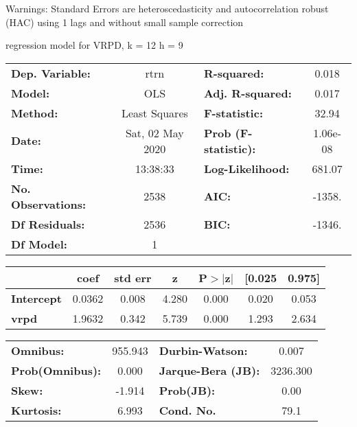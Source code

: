 Warnings: \newline
 [1] Standard Errors are heteroscedasticity and autocorrelation robust (HAC) using 1 lags and without small sample correction\ 

regression model for VRPD, k = 12 h = 9\begin{center}
\begin{tabular}{lclc}
\toprule
\textbf{Dep. Variable:}    &       rtrn       & \textbf{  R-squared:         } &     0.018   \\
\textbf{Model:}            &       OLS        & \textbf{  Adj. R-squared:    } &     0.017   \\
\textbf{Method:}           &  Least Squares   & \textbf{  F-statistic:       } &     32.94   \\
\textbf{Date:}             & Sat, 02 May 2020 & \textbf{  Prob (F-statistic):} &  1.06e-08   \\
\textbf{Time:}             &     13:38:33     & \textbf{  Log-Likelihood:    } &    681.07   \\
\textbf{No. Observations:} &        2538      & \textbf{  AIC:               } &    -1358.   \\
\textbf{Df Residuals:}     &        2536      & \textbf{  BIC:               } &    -1346.   \\
\textbf{Df Model:}         &           1      & \textbf{                     } &             \\
\bottomrule
\end{tabular}
\begin{tabular}{lcccccc}
                   & \textbf{coef} & \textbf{std err} & \textbf{z} & \textbf{P$> |$z$|$} & \textbf{[0.025} & \textbf{0.975]}  \\
\midrule
\textbf{Intercept} &       0.0362  &        0.008     &     4.280  &         0.000        &        0.020    &        0.053     \\
\textbf{vrpd}      &       1.9632  &        0.342     &     5.739  &         0.000        &        1.293    &        2.634     \\
\bottomrule
\end{tabular}
\begin{tabular}{lclc}
\textbf{Omnibus:}       & 955.943 & \textbf{  Durbin-Watson:     } &    0.007  \\
\textbf{Prob(Omnibus):} &   0.000 & \textbf{  Jarque-Bera (JB):  } & 3236.300  \\
\textbf{Skew:}          &  -1.914 & \textbf{  Prob(JB):          } &     0.00  \\
\textbf{Kurtosis:}      &   6.993 & \textbf{  Cond. No.          } &     79.1  \\
\bottomrule
\end{tabular}
\end{center}

